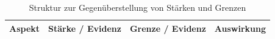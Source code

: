 \begin{table}[H]
  \centering
  \small
  \renewcommand{\arraystretch}{1.2}
  \caption{Struktur zur Gegenüberstellung von Stärken und Grenzen}
  \label{tab:strengths-limitations}
  \begin{tabularx}{\textwidth}{@{}p{}p{}p{}>{\raggedright\arraybackslash}X@{}}
    \toprule
    \textbf{Aspekt} & \textbf{Stärke / Evidenz} & \textbf{Grenze / Evidenz} & \textbf{Auswirkung} \\
    \midrule
    \bottomrule
  \end{tabularx}
\end{table}

